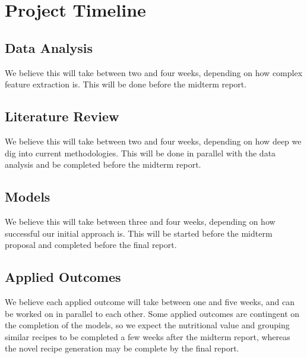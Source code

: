 \documentclass[sigconf]{acmart}
\begin{document}

\section{Project Timeline}
\subsection{Data Analysis}
We believe this will take between two and four weeks, depending on how complex feature extraction is. This will be done before the midterm report.

\subsection{Literature Review}
We believe this will take between two and four weeks, depending on how deep we dig into current methodologies. This will be done in parallel with the data analysis and be completed before the midterm report.

\subsection{Models}
We believe this will take between three and four weeks, depending on how successful our initial approach is. This will be started before the midterm proposal and completed before the final report.

\subsection{Applied Outcomes}
We believe each applied outcome will take between one and five weeks, and can be worked on in parallel to each other. Some applied outcomes are contingent on the completion of the models, so we expect the nutritional value and grouping similar recipes to be completed a few weeks after the midterm report, whereas the novel recipe generation may be complete by the final report.
\end{document}
